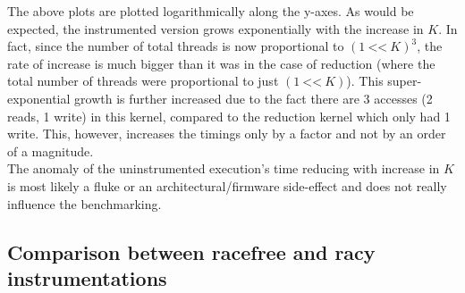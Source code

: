 \documentclass{btp}
\begin{document}
The above plots are plotted logarithmically along the y-axes. As would be expected, the instrumented version grows exponentially with the increase in $K$. In fact, since the number of total threads is now proportional to $(1\ \texttt{<<}\ K)^3$, the rate of increase is much bigger than it was in the case of reduction (where the total number of threads were proportional to just $(1\ \texttt{<<}\ K)$). This super-exponential growth is further increased due to the fact there are 3 accesses (2 reads, 1 write) in this kernel, compared to the reduction kernel which only had 1 write. This, however, increases the timings only by a factor and not by an order of a magnitude.
\\
\newline
The anomaly of the uninstrumented execution's time reducing with increase in $K$ is most likely a fluke or an architectural/firmware side-effect and does not really influence the benchmarking.

\subsection{Comparison between racefree and racy instrumentations}
\end{document}
